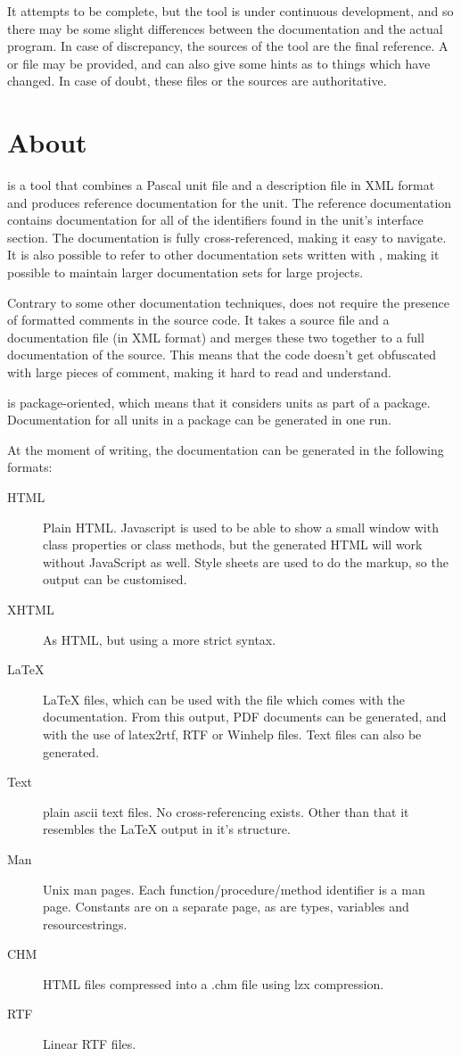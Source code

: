 It attempts to be complete, but the tool is under continuous development,
and so there may be some slight differences between the documentation and
the actual program. In case of discrepancy, the sources of the tool are the
final reference. A  or  file may be provided, and
can also give some hints as to things which have changed. In case of doubt,
these files or the sources are authoritative.

\section{About \fpdoc}
\fpdoc is a tool that combines a Pascal unit file and a description file
in XML format and produces reference documentation for the unit. The
reference documentation contains documentation for all of the identifiers
found in the unit's interface section. The documentation is fully
cross-referenced, making it easy to navigate. It is also possible to refer
to other documentation sets written with \fpdoc, making it possible to
maintain larger documentation sets for large projects.

Contrary to some other documentation techniques, \fpdoc does not require the
presence of formatted comments in the source code. It takes a source file
and a documentation file (in XML format) and merges these two together to a
full documentation of the source. This means that the code doesn't get
obfuscated with large pieces of comment, making it hard to read and
understand. 

\fpdoc is package-oriented, which means that it considers units as part of a
package. Documentation for all units in a package can be generated in one
run.

At the moment of writing, the documentation can be generated in the
following formats:
\begin{description}
\item[HTML] Plain HTML. Javascript is used to be able to show a small window
with class properties or class methods, but the generated HTML will work
without JavaScript as well. Style sheets are used to do the markup, so the
output can be customised.
\item[XHTML] As HTML, but using a more strict syntax.
\item[LaTeX] LaTeX files, which can be used with the  file
which comes with the \fpc documentation. From this output, PDF documents can
be generated, and with the use of latex2rtf, RTF or Winhelp files. Text
files can also be generated.
\item[Text] plain ascii text files. No cross-referencing exists. Other than
that it resembles the LaTeX output in it's structure.
\item[Man] Unix man pages. Each function/procedure/method identifier is a man
page. Constants are on a separate page, as are types, variables and
resourcestrings.
\item[CHM] HTML files compressed into a .chm file using lzx compression.
\item[RTF] Linear RTF files.
\end{description}

